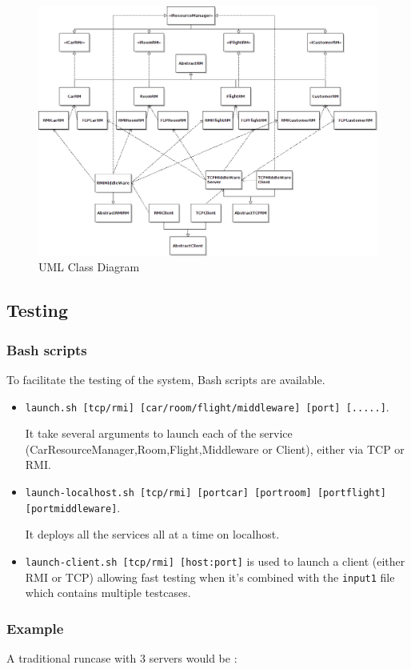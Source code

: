 \documentclass[a4paper]{article}
\begin{document}
\begin{figure}
  \centering
	\includegraphics[scale=0.6,angle=90]{classhierarchy.png}
  \caption{UML Class Diagram}
  \label{uml}
\end{figure}


\subsection{Testing}
\subsubsection{Bash scripts}
To facilitate the testing of the system, Bash scripts are available.
\begin{itemize}
\item{
{\tt launch.sh [tcp/rmi] [car/room/flight/middleware] [port] [.....]}.

It take several arguments to launch each of the service (CarResourceManager,Room,Flight,Middleware or Client), either via TCP or RMI.
}
\item{
{\tt launch-localhost.sh [tcp/rmi] [portcar] [portroom] [portflight] [portmiddleware]}.

It deploys all the services all at a time on localhost.
}
\item{
{\tt launch-client.sh [tcp/rmi] [host:port]} is used to launch a client (either RMI or TCP) 
allowing fast testing when it's combined with the {\tt input1} file which contains multiple testcases.
}
\end{itemize}

\subsubsection{Example}
A traditional runcase with 3 servers would be :
\end{document}
